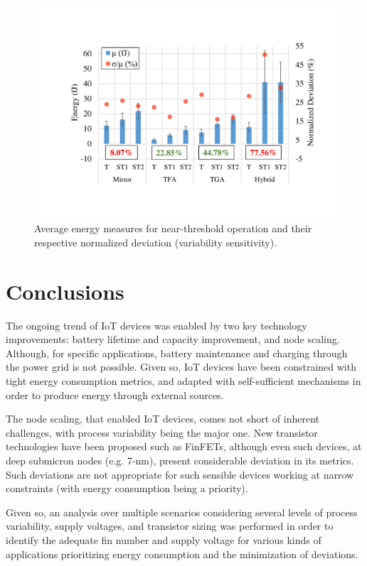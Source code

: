 \documentclass[pgmicro,mestrado,english]{iiufrgs}
\begin{document}

\begin{figure}[]
  \centering
    \includegraphics[width=\textwidth, trim={3.5cm 3cm 2cm 3.5cm}, clip]{averageEnergyNT.pdf}
     \caption{Average energy measures for near-threshold operation and their respective normalized deviation (variability sensitivity).}
  \label{fig:avgEnergyNT}
\end{figure}

\chapter{Conclusions}

The ongoing trend of IoT devices was enabled by two key technology improvements: battery lifetime and capacity improvement, and node scaling. Although, for specific applications, battery maintenance and charging through the power grid is not possible. Given so, IoT devices have been constrained with tight energy consumption metrics, and adapted with self-sufficient mechanisms in order to produce energy through external sources.

The node scaling, that enabled IoT devices, comes not short of inherent challenges, with process variability being the major one. New transistor technologies have been proposed such as FinFETs, although even such devices, at deep submicron nodes (e.g. 7-nm), present considerable deviation in its metrics. Such deviations are not appropriate for such sensible devices working at narrow constraints (with energy consumption being a priority).

Given so, an analysis over multiple scenarios considering several levels of process variability, supply voltages, and transistor sizing was performed in order to identify the adequate fin number and supply voltage for various kinds of applications prioritizing energy consumption and the minimization of deviations. 
\end{document}
